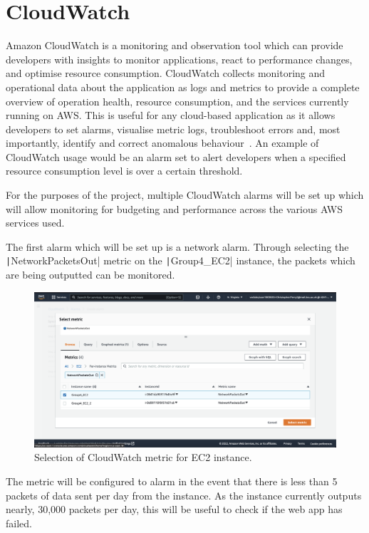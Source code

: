 \chapter{CloudWatch}\label{ch:cloudwatch}

Amazon CloudWatch is a monitoring and observation tool which can provide developers with insights to monitor
applications, react to performance changes, and optimise resource consumption.
CloudWatch collects monitoring and operational data about the application as logs and metrics to provide a
complete overview of operation health, resource consumption, and the services currently running on AWS\@.
This is useful for any cloud-based application as it allows developers to set alarms, visualise metric logs,
troubleshoot errors and, most importantly, identify and correct anomalous behaviour~\parencite{amazon2022amazon}.
An example of CloudWatch usage would be an alarm set to alert developers when a specified resource consumption level
is over a certain threshold.

For the purposes of the project, multiple CloudWatch alarms will be set up which will allow monitoring for budgeting
and performance across the various AWS services used.

The first alarm which will be set up is a network alarm.
Through selecting the \texttt|NetworkPacketsOut| metric on the \texttt|Group4_EC2| instance,
the packets which are being outputted can be monitored.

\begin{figure}[!htbp]
    \centering
    \includegraphics[width=\textwidth]{resources/cloudwatch/cloudwatch-metric-selection}
    \caption{Selection of CloudWatch metric for EC2 instance.}
    \label{fig:cloudwatch-metrics}
\end{figure}

The metric will be configured to alarm in the event that there is less than 5 packets of data sent per day from the
instance.
As the instance currently outputs nearly, 30,000 packets per day, this will be useful to check if the web app has failed.

